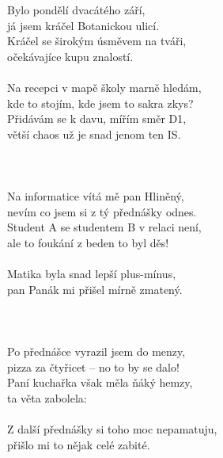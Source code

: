 
\begin{Large}
Bylo pondělí dvacátého září,\\
já jsem kráčel Botanickou ulicí.\\
Kráčel se širokým úsměvem na tváři,\\
očekávajíce kupu znalostí.\\
\\
Na recepci v mapě školy marně hledám,\\
kde to stojím, kde jsem to sakra zkys?\\
Přidávám se k davu, mířím směr D1,\\
větší chaos už je snad jenom ten IS.\\
\\
\\
\\
Na informatice vítá mě pan Hliněný,\\
nevím co jsem si z tý přednášky odnes.\\
Student A se studentem B v relaci není,\\
ale to foukání z beden to byl děs!\\
\\
Matika byla snad lepší plus-mínus,\\
pan Panák mi přišel mírně zmatený.\\
\\
\chorus\\
\\
Po přednášce vyrazil jsem do menzy,\\
pizza za čtyřicet -- no to by se dalo!\\
Paní kuchařka však měla ňáký hemzy,\\
ta věta zabolela: \\
\\
Z další přednášky si toho moc nepamatuju,\\
přišlo mi to nějak celé zabité.\\

\end{Large}
